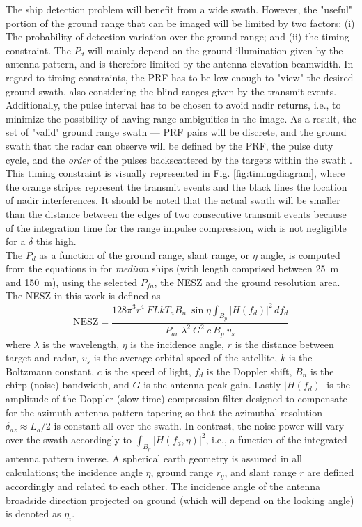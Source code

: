\documentclass[conference,a4paper]{IEEEtran}
\begin{document}
    The ship detection problem will benefit from a wide swath.
    However, the "useful" portion of the ground range that can be imaged will be limited by two factors: (i) The probability of detection variation over the ground range;
    and (ii) the timing constraint.
    The $P_d$ will mainly depend on the ground illumination given by the antenna pattern, and is therefore limited by the antenna elevation beamwidth.
    In regard to timing constraints, the PRF has to be low enough to "view" the desired ground swath, also considering the blind ranges given by the transmit events.
    Additionally, the pulse interval has to be chosen to avoid nadir returns, i.e., to minimize the possibility of having range ambiguities in the image.
    As a result, the set of "valid" ground range swath --- PRF pairs will be discrete, and the ground swath that the radar can observe will be defined by the PRF, the pulse duty cycle, and the \emph{order} of the pulses backscattered by the targets within the swath \cite{curlander1991synthetic}.
    This timing constraint is visually represented in Fig. \ref{fig:timingdiagram}, where the orange stripes represent the transmit events and the black lines the location of nadir interferences.
    It should be noted that the actual swath will be smaller than the distance between the edges of two consecutive transmit events because of the integration time for the range impulse compression, wich is not negligible for a $\delta$ this high.\\
    The $P_d$ as a function of the ground range, slant range, or $\eta$ angle, is computed from the equations in \cite{DLRjournal} for \emph{medium} ships (with length comprised between 25~m and 150~m), using the selected $P_{fa}$, the NESZ and the ground resolution area.
    The NESZ in this work is defined as
    \begin{equation}
        \text{NESZ} =\dfrac{128 \pi^3 r^4\ F L k T_a B_n\  \sin{\eta}\int_{B_p}\left| H(f_d) \right|^2\, df_d}{P_{av}\  \lambda^2\ G^2\ c\ B_p\ v_s}
        \label{eq:nesz}
    \end{equation}
    where $\lambda$ is the wavelength, $\eta$ is the incidence angle, $r$ is the distance between target and radar, $v_s$ is the average orbital speed of the satellite, $k$ is the Boltzmann constant, $c$ is the speed of light, $f_d$ is the Doppler shift, $B_n$ is the chirp (noise) bandwidth, and $G$ is the antenna peak gain.
    Lastly $|H(f_d)|$ is the amplitude of the Doppler (slow-time) compression filter designed to compensate for the azimuth antenna pattern tapering so that the azimuthal resolution $\delta_{az}\approx L_a/2$ is constant all over the swath.
    In contrast, the noise power will vary over the swath accordingly to $\int_{B_{p}}|H(f_d, \eta)|^2$, i.e., a function of the integrated antenna pattern inverse.
    A spherical earth geometry is assumed in all calculations;
    the incidence angle $\eta$, ground range $r_g$, and slant range $r$ are defined accordingly and related to each other.
    The incidence angle of the antenna broadside direction projected on ground (which will depend on the looking angle) is denoted as $\eta_i$.
\end{document}
